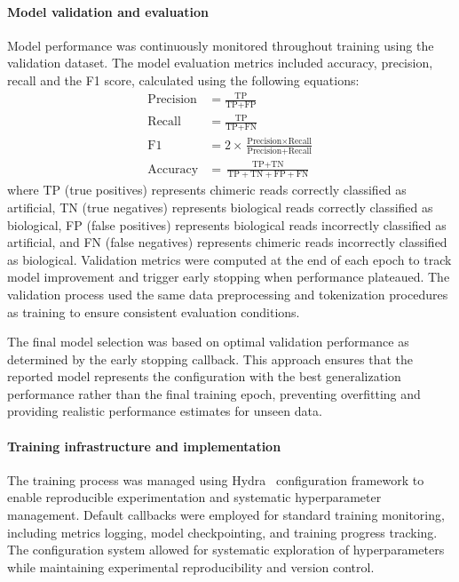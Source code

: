\documentclass[pdflatex,sn-nature]{sn-jnl}%
\theoremstyle{thmstyleone}%
\theoremstyle{thmstyletwo}%
\theoremstyle{thmstylethree}%
\begin{document}
\paragraph{Model validation and evaluation}
Model performance was continuously monitored throughout training using the validation dataset.
The model evaluation metrics included accuracy, precision, recall and the F1 score, calculated using the following equations:
\begin{align*}
	\textrm{Precision} & = \frac{\textrm{TP}}{\textrm{TP}+\textrm{FP}}                                                     \\
	\textrm{Recall}    & = \frac{\textrm{TP}}{\textrm{TP}+\textrm{FN}}                                                     \\
	\textrm{F1}        & = 2 \times \frac{\textrm{Precision} \times \textrm{Recall}}{\textrm{Precision} + \textrm{Recall}} \\
	\textrm{Accuracy}  & = \frac{\textrm{TP} + \textrm{TN}}{\textrm{TP} + \textrm{TN} + \textrm{FP} + \textrm{FN}}
\end{align*}
where TP (true positives) represents chimeric reads correctly classified as artificial, TN (true negatives) represents biological reads correctly classified as biological, FP (false positives) represents biological reads incorrectly classified as artificial, and FN (false negatives) represents chimeric reads incorrectly classified as biological.
Validation metrics were computed at the end of each epoch to track model improvement and trigger early stopping when performance plateaued.
The validation process used the same data preprocessing and tokenization procedures as training to ensure consistent evaluation conditions.

The final model selection was based on optimal validation performance as determined by the early stopping callback.
This approach ensures that the reported model represents the configuration with the best generalization performance rather than the final training epoch, preventing overfitting and providing realistic performance estimates for unseen data.

\paragraph{Training infrastructure and implementation}
The training process was managed using Hydra~\cite{Yadan2019Hydra} configuration framework to enable reproducible experimentation and systematic hyperparameter management.
Default callbacks were employed for standard training monitoring, including metrics logging, model checkpointing, and training progress tracking.
The configuration system allowed for systematic exploration of hyperparameters while maintaining experimental reproducibility and version control.
\end{document}
